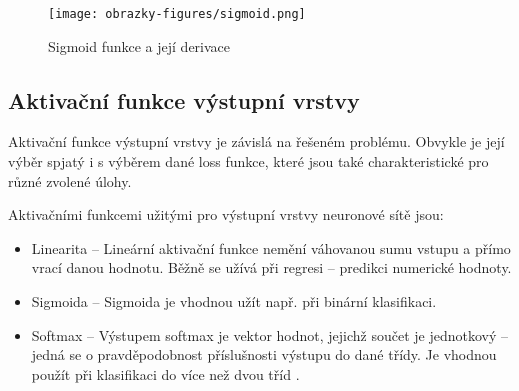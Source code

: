 \begin{figure}[!htbp]
    \centering
    \texttt{[image: obrazky-figures/sigmoid.png]}
    \caption{Sigmoid funkce a její derivace \cite{VanishingGradientProblem}}
\end{figure}



\subsection*{Aktivační funkce výstupní vrstvy}
Aktivační funkce výstupní vrstvy je závislá na řešeném problému. Obvykle je její výběr spjatý i s výběrem dané loss funkce, které jsou také charakteristické pro různé zvolené úlohy.

Aktivačními funkcemi užitými pro výstupní vrstvy neuronové sítě jsou:
\begin{itemize}
    \item Linearita -- Lineární aktivační funkce nemění váhovanou sumu vstupu a přímo vrací danou hodnotu. Běžně se užívá při regresi -- predikci numerické hodnoty.
    \item Sigmoida -- Sigmoida je vhodnou užít např. při binární klasifikaci.
    \item Softmax -- Výstupem softmax je vektor hodnot, jejichž součet je jednotkový -- jedná se o pravděpodobnost příslušnosti výstupu do dané třídy. Je vhodnou použít při klasifikaci do více než dvou tříd \cite{HowToChooseActivationFunction}. 
\end{itemize}



